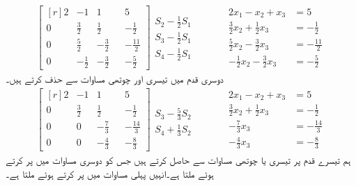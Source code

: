 \begin{gather*}
\begin{bmatrix*}[r]
2&-1&1&&5\\[0.5ex]
0&\frac{3}{2}&\frac{1}{2}&&-\frac{1}{2}\\[0.5ex]
0&\frac{5}{2}&-\frac{3}{2}&&-\frac{11}{2}\\[0.5ex]
0&-\frac{1}{2}&-\frac{3}{2}&&-\frac{5}{2}
\end{bmatrix*}
\begin{matrix}
\\[0.5ex]
S_2-\frac{1}{2}S_1\\[0.5ex]
S_3-\frac{1}{2}S_1\\[0.5ex]
S_4-\frac{1}{2}S_1\\
\end{matrix}
\quad\quad \quad
\begin{aligned}
2x_1-x_2+x_3&=5\\
\frac{3}{2}x_2+\frac{1}{2}x_3&=-\frac{1}{2}\\
\frac{5}{2}x_2-\frac{3}{2}x_3&=-\frac{11}{2}\\
-\frac{1}{2}x_2-\frac{3}{2}x_3&=-\frac{5}{2}
\end{aligned}
\end{gather*}
دوسری قدم میں تیسری اور چوتھی مساوات سے  حذف کرتے ہیں۔
\begin{gather*}
\begin{bmatrix*}[r]
2&-1&1&&5\\[0.5ex]
0&\frac{3}{2}&\frac{1}{2}&&-\frac{1}{2}\\[0.5ex]
0&0&-\frac{7}{3}&&-\frac{14}{3}\\[0.5ex]
0&0&-\frac{4}{3}&&-\frac{8}{3}
\end{bmatrix*}
\begin{matrix}
\\[0.5ex]
\\[0.5ex]
S_3-\frac{5}{3}S_2\\[0.5ex]
S_4+\frac{1}{3}S_2\\
\end{matrix}
\quad\quad \quad
\begin{aligned}
2x_1-x_2+x_3&=5\\
\frac{3}{2}x_2+\frac{1}{2}x_3&=-\frac{1}{2}\\
-\frac{7}{3}x_3&=-\frac{14}{3}\\
-\frac{4}{3}x_3&=-\frac{8}{3}
\end{aligned}
\end{gather*}
ہم تیسرے قدم پر تیسری یا چوتھی مساوات سے  حاصل کرتے ہیں جس کو دوسری مساوات میں پر کرتے ہوئے  ملتا ہے۔انہیں پہلی مساوات میں پر کرتے ہوئے  ملتا ہے۔

